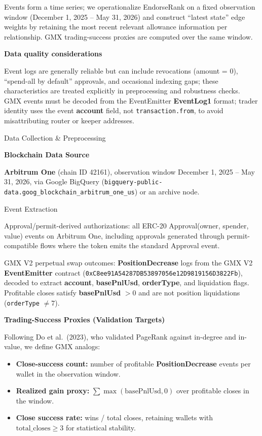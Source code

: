 Events form a time series; we operationalize EndorseRank on a fixed observation window (December 1, 2025 -- May 31, 2026) and construct ``latest state'' edge weights by retaining the most recent relevant allowance information per relationship. GMX trading-success proxies are computed over the same window.


\textbf{Data quality considerations}


Event logs are generally reliable but can include revocations (amount = 0), ``spend-all by default'' approvals, and occasional indexing gaps; these characteristics are treated explicitly in preprocessing and robustness checks. GMX events must be decoded from the EventEmitter \textbf{EventLog1} format; trader identity uses the event \textbf{account} field, not \texttt{transaction.from}, to avoid misattributing router or keeper addresses.


Data Collection \& Preprocessing


\textbf{Blockchain Data Source}


\textbf{Arbitrum One} (chain ID 42161), observation window December 1, 2025 -- May 31, 2026, via Google BigQuery (\texttt{bigquery-public-data.goog\_blockchain\_arbitrum\_one\_us}) or an archive node.


Event Extraction


Approval/permit-derived authorizations: all ERC-20 Approval(owner, spender, value) events on Arbitrum One, including approvals generated through permit-compatible flows where the token emits the standard Approval event.


GMX V2 perpetual swap outcomes: \textbf{PositionDecrease} logs from the GMX V2 \textbf{EventEmitter} contract (\texttt{0xC8ee91A54287DB53897056e12D9819156D3822Fb}), decoded to extract \textbf{account}, \textbf{basePnlUsd}, \textbf{orderType}, and liquidation flags. Profitable closes satisfy \textbf{basePnlUsd} $> 0$ and are not position liquidations (\texttt{orderType} $\neq 7$).


\textbf{Trading-Success Proxies (Validation Targets)}


Following Do et al.\ (2023), who validated PageRank against in-degree and in-value, we define GMX analogs:

\begin{itemize}
\item[\textbullet] \textbf{Close-success count:} number of profitable \textbf{PositionDecrease} events per wallet in the observation window.
\item[\textbullet] \textbf{Realized gain proxy:} $\sum \max(\text{basePnlUsd}, 0)$ over profitable closes in the window.
\item[\textbullet] \textbf{Close success rate:} wins / total closes, retaining wallets with $\text{total\_closes} \geq 3$ for statistical stability.
\end{itemize}


